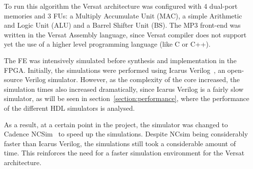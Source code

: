 To run this algorithm the Versat architecture was configured with 4 dual-port
memories and 3 FUs: a Multiply Accumulate Unit (MAC), a simple Arithmetic and
Logic Unit (ALU) and a Barrel Shifter Unit (BS). The MP3 front-end was written
in the Versat Assembly language, since Versat compiler does not support yet the
use of a higher level programming language (like C or C++).

The FE was intensively simulated before synthesis and implementation in the
FPGA. Initially, the simulations were performed using Icarus
Verilog~\cite{icarus:verilog}, an open-source Verilog simulator. However, as the
complexity of the core increased, the simulation times also increased
dramatically, since Icarus Verilog is a fairly slow simulator, as will be seen
in section~\ref{section:performance}, where the performance of the different HDL
simulators is analysed.

As a result, at a certain point in the project, the simulator was changed to
Cadence NCSim~\cite{cadence:ncsim} to speed up the simulations. Despite NCsim
being considerably faster than Icarus Verilog, the simulations still took a
considerable amount of time. This reinforces the need for a faster simulation
environment for the Versat architecture.
